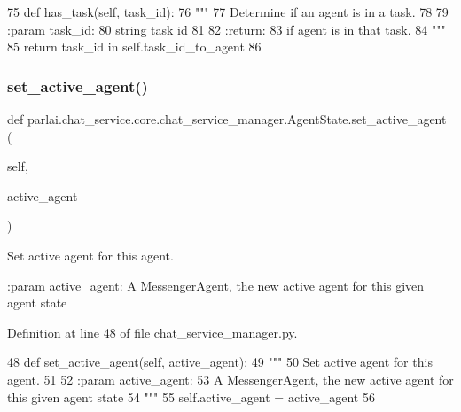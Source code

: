 \begin{DoxyCode}
75     \textcolor{keyword}{def }has\_task(self, task\_id):
76         \textcolor{stringliteral}{"""}
77 \textcolor{stringliteral}{        Determine if an agent is in a task.}
78 \textcolor{stringliteral}{}
79 \textcolor{stringliteral}{        :param task\_id:}
80 \textcolor{stringliteral}{            string task id}
81 \textcolor{stringliteral}{}
82 \textcolor{stringliteral}{        :return:}
83 \textcolor{stringliteral}{            if agent is in that task.}
84 \textcolor{stringliteral}{        """}
85         \textcolor{keywordflow}{return} task\_id \textcolor{keywordflow}{in} self.task\_id\_to\_agent
86 
\end{DoxyCode}
\mbox{\label{classparlai_1_1chat__service_1_1core_1_1chat__service__manager_1_1AgentState_ab2caf3eced8c9eac55b76ecdd292b955}} 
\subsubsection{\texorpdfstring{set\+\_\+active\+\_\+agent()}{set\_active\_agent()}}
{\footnotesize\ttfamily def parlai.\+chat\+\_\+service.\+core.\+chat\+\_\+service\+\_\+manager.\+Agent\+State.\+set\+\_\+active\+\_\+agent (\begin{DoxyParamCaption}\item[{}]{self,  }\item[{}]{active\+\_\+agent }\end{DoxyParamCaption})}

\begin{DoxyVerb}Set active agent for this agent.

:param active_agent:
    A MessengerAgent, the new active agent for this given agent state
\end{DoxyVerb}
 

Definition at line 48 of file chat\+\_\+service\+\_\+manager.\+py.


\begin{DoxyCode}
48     \textcolor{keyword}{def }set\_active\_agent(self, active\_agent):
49         \textcolor{stringliteral}{"""}
50 \textcolor{stringliteral}{        Set active agent for this agent.}
51 \textcolor{stringliteral}{}
52 \textcolor{stringliteral}{        :param active\_agent:}
53 \textcolor{stringliteral}{            A MessengerAgent, the new active agent for this given agent state}
54 \textcolor{stringliteral}{        """}
55         self.active\_agent = active\_agent
56 
\end{DoxyCode}


